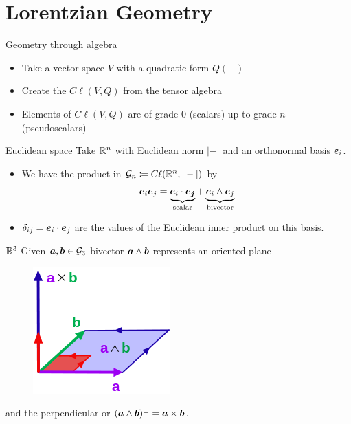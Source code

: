 \documentclass[UKenglish]{beamer}
\begin{document}
\section{Lorentzian Geometry}

\begin{frame}{Geometry through algebra}
\vfill
\begin{itemize}
	\item Take a vector space $V$ with a quadratic form $Q(-)$
	\item Create the  $C\ell(V,Q)$ from the tensor algebra
	\item Elements of $C\ell(V,Q)$ are  of grade 0 (scalars) up to grade $n$ (pseudoscalars)
\end{itemize}
\vfill
\end{frame}

\begin{frame}{Euclidean space}
\vfill
Take $\mathbb{R}^n$ with Euclidean norm $|-|$ and an orthonormal basis $\boldsymbol{e}_i$.
\begin{itemize}
	\item We have the product in $\mathcal{G}_n\coloneqq C\ell(\mathbb{R}^n,|-|)$ by
	\[
	\boldsymbol{e}_i \boldsymbol{e}_j = \underbrace{\boldsymbol{e}_i \cdot \boldsymbol{e_j}}_{\textrm{scalar}} + \underbrace{\boldsymbol{e}_i \wedge \boldsymbol{e}_j}_{\textrm{bivector}}
	\]
	\item $\delta_{ij}=\boldsymbol{e}_i\cdot \boldsymbol{e}_j$ are the values of the Euclidean inner product on this basis.
\end{itemize}
\vfill
\end{frame}

\begin{frame}{$\mathbb{R}^3$}
\vfill
Given $\boldsymbol{a},\boldsymbol{b}\in \mathcal{G}_3$ bivector $\boldsymbol{a}\wedge \boldsymbol{b}$ represents an oriented plane
	\begin{figure}[H]
		\includegraphics[width=.3\textwidth]{figures/bivector.png}
	\end{figure}
and the perpendicular or  $(\boldsymbol{a}\wedge \boldsymbol{b})^\perp = \boldsymbol{a}\times \boldsymbol{b}$.
\vfill
\end{frame}
\end{document}
